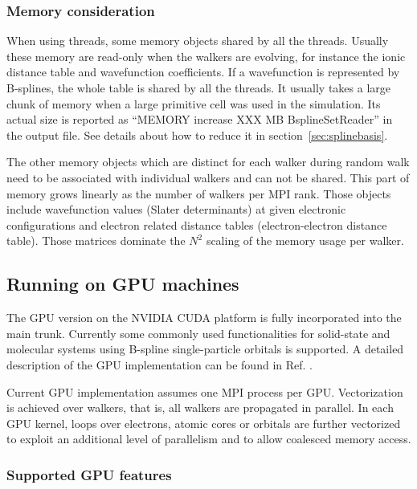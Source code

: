 \subsubsection{Memory consideration}
When using threads, some memory objects shared by all the threads. Usually these memory are read-only when the walkers are evolving, for instance the ionic distance table and wavefunction coefficients.
If a wavefunction is represented by B-splines, the whole table is shared by all the threads. It usually takes a large chunk of memory when a large primitive cell was used in the simulation. Its actual size is reported as ``MEMORY increase XXX MB BsplineSetReader'' in the output file.
See details about how to reduce it in section~\ref{sec:splinebasis}.

The other memory objects which are distinct for each walker during random walk need to be associated with individual walkers and can not be shared. This part of memory grows linearly as the number of walkers per MPI rank. Those objects include wavefunction values (Slater determinants) at given electronic configurations and electron related distance tables (electron-electron distance table). Those matrices dominate the $N^2$ scaling of the memory usage per walker.

\subsection{Running on GPU machines}
\label{sec:gpurunning}

The GPU version on the NVIDIA CUDA platform is fully incorporated into
the main trunk. Currently some commonly used functionalities for
solid-state and molecular systems using B-spline single-particle
orbitals is supported. A detailed description of the GPU
implementation can be found in Ref. \cite{EslerKimCeperleyShulenburger2012}.

Current GPU implementation assumes one MPI process per GPU.
Vectorization is achieved over walkers, that is, all walkers are
propagated in parallel. In each GPU kernel, loops over electrons,
atomic cores or orbitals are further vectorized to exploit an
additional level of parallelism and to allow coalesced memory access.


\subsubsection{Supported GPU features}

